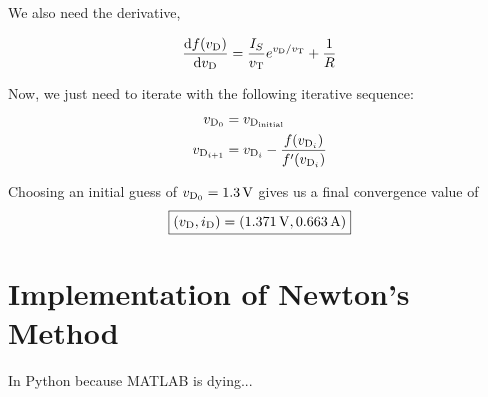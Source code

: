 \documentclass{article}
\begin{document}
We also need the derivative, 

\begin{equation}
  \dv{f(v_\text{D})}{v_\text{D}} = 
  \frac{I_S}{v_\text{T}}e^{v_\text{D}/v_\text{T}} 
  + \frac{1
  }{
    R
  }
\end{equation}

Now, we just need to iterate with the following iterative sequence:
\begin{equation}
  \begin{aligned}
    v_{\text{D}_0} &= v_{\text{D}_\text{initial}} \\
    v_{\text{D}_{i+1}} &= v_{\text{D}_i} - \frac{
      f(v_{\text{D}_i})
    }{
        f'(v_{\text{D}_i})
    }
  \end{aligned}
\end{equation}

Choosing an initial guess of $v_{\text{D}_0} = \SI{1.3}{\volt}$ gives us a final convergence value of
\begin{equation}
  \boxed{
    (v_\text{D}, i_\text{D}) = (\SI{1.371}{\volt}, \SI{0.663}{\ampere})
  }
\end{equation}

\clearpage
\appendix
\section{Implementation of Newton's Method}
In Python because MATLAB is dying...


\end{document}
